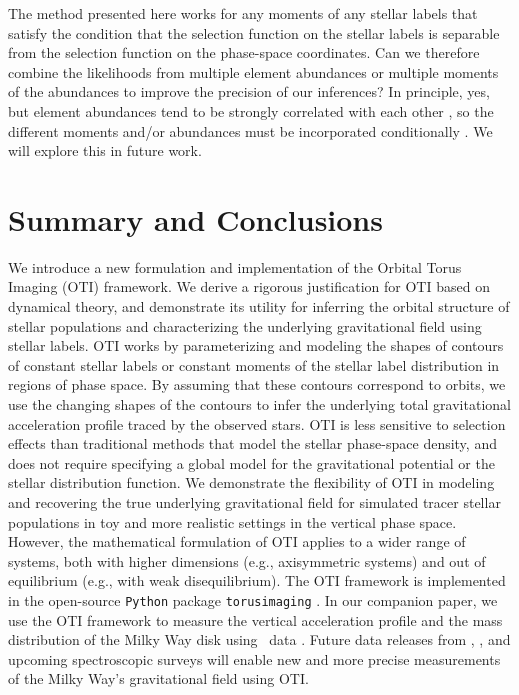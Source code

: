 \documentclass[modern]{aastex631}
\begin{document}
The method presented here works for any moments of any stellar labels that satisfy the
condition that the selection function on the stellar labels is separable from the
selection function on the phase-space coordinates.
Can we therefore combine the likelihoods from multiple element abundances or multiple
moments of the abundances to improve the precision of our inferences?
In principle, yes, but element abundances tend to be strongly correlated with each other
\citep[e.g.,][]{Ness:2019, Griffith:2023}, so the different moments and/or abundances
must be incorporated conditionally \citep[e.g.,][]{Ratcliffe:2023}.
We will explore this in future work.


\section{Summary and Conclusions} \label{sec:conclusions}

We introduce a new formulation and implementation of the Orbital Torus Imaging (OTI)
framework.
We derive a rigorous justification for OTI based on dynamical theory, and demonstrate
its utility for inferring the orbital structure of stellar populations and
characterizing the underlying gravitational field using stellar labels.
OTI works by parameterizing and modeling the shapes of contours of constant stellar
labels or constant moments of the stellar label distribution in regions of phase space.
By assuming that these contours correspond to orbits, we use the changing shapes of the
contours to infer the underlying total gravitational acceleration profile traced by the
observed stars.
OTI is less sensitive to selection effects than traditional methods that model the
stellar phase-space density, and does not require specifying a global model for the
gravitational potential or the stellar distribution function.
We demonstrate the flexibility of OTI in modeling and recovering the true underlying
gravitational field for simulated tracer stellar populations in toy and more realistic
settings in the vertical phase space.
However, the mathematical formulation of OTI applies to a wider range of systems, both
with higher dimensions (e.g., axisymmetric systems) and out of equilibrium (e.g., with
weak disequilibrium).
The OTI framework is implemented in the open-source \texttt{Python} package
\texttt{torusimaging} \citep{torusimaging:zenodo}.
In our companion paper, we use the OTI framework to measure the vertical acceleration
profile and the mass distribution of the Milky Way disk using \apogee\ data
\citep{Horta:2023}.
Future data releases from \gaia, \sdssv, and upcoming spectroscopic surveys will enable
new and more precise measurements of the Milky Way's gravitational field using OTI.
\end{document}
